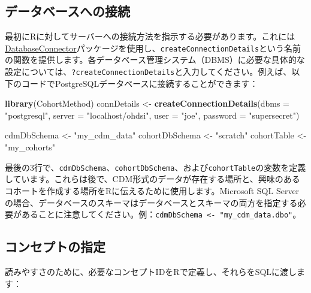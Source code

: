 \documentclass[
  11pt]{book}
\newenvironment{Shaded}{\begin{snugshade}}{\end{snugshade}}
\newcommand{\AttributeTok}[1]{\textcolor[rgb]{0.13,0.29,0.53}{#1}}
\newcommand{\FunctionTok}[1]{\textcolor[rgb]{0.13,0.29,0.53}{\textbf{#1}}}
\newcommand{\NormalTok}[1]{#1}
\newcommand{\OtherTok}[1]{\textcolor[rgb]{0.56,0.35,0.01}{#1}}
\newcommand{\StringTok}[1]{\textcolor[rgb]{0.31,0.60,0.02}{#1}}
\theoremstyle{definition}
\theoremstyle{definition}
\theoremstyle{definition}
\theoremstyle{definition}
\theoremstyle{remark}
\begin{document}
\subsection{データベースへの接続}\label{ux30c7ux30fcux30bfux30d9ux30fcux30b9ux3078ux306eux63a5ux7d9a-1}

最初にRに対してサーバーへの接続方法を指示する必要があります。これには\href{https://ohdsi.github.io/DatabaseConnector/}{DatabaseConnector}パッケージを使用し、\texttt{createConnectionDetails}という名前の関数を提供します。各データベース管理システム（DBMS）に必要な具体的な設定については、\texttt{?createConnectionDetails}と入力してください。例えば、以下のコードでPostgreSQLデータベースに接続することができます：

\begin{Shaded}
\begin{Highlighting}[]
\FunctionTok{library}\NormalTok{(CohortMethod)}
\NormalTok{connDetails }\OtherTok{\textless{}{-}} \FunctionTok{createConnectionDetails}\NormalTok{(}\AttributeTok{dbms =} \StringTok{"postgresql"}\NormalTok{,}
                                       \AttributeTok{server =} \StringTok{"localhost/ohdsi"}\NormalTok{,}
                                       \AttributeTok{user =} \StringTok{"joe"}\NormalTok{,}
                                       \AttributeTok{password =} \StringTok{"supersecret"}\NormalTok{)}

\NormalTok{cdmDbSchema }\OtherTok{\textless{}{-}} \StringTok{"my\_cdm\_data"}
\NormalTok{cohortDbSchema }\OtherTok{\textless{}{-}} \StringTok{"scratch"}
\NormalTok{cohortTable }\OtherTok{\textless{}{-}} \StringTok{"my\_cohorts"}
\end{Highlighting}
\end{Shaded}

最後の3行で、\texttt{cdmDbSchema}、\texttt{cohortDbSchema}、および\texttt{cohortTable}の変数を定義しています。これらは後で、CDM形式のデータが存在する場所と、興味のあるコホートを作成する場所をRに伝えるために使用します。Microsoft SQL Serverの場合、データベースのスキーマはデータベースとスキーマの両方を指定する必要があることに注意してください。例：\texttt{cdmDbSchema\ \textless{}-\ "my\_cdm\_data.dbo"}。

\subsection{コンセプトの指定}\label{ux30b3ux30f3ux30bbux30d7ux30c8ux306eux6307ux5b9a}

読みやすさのために、必要なコンセプトIDをRで定義し、それらをSQLに渡します：
\end{document}
